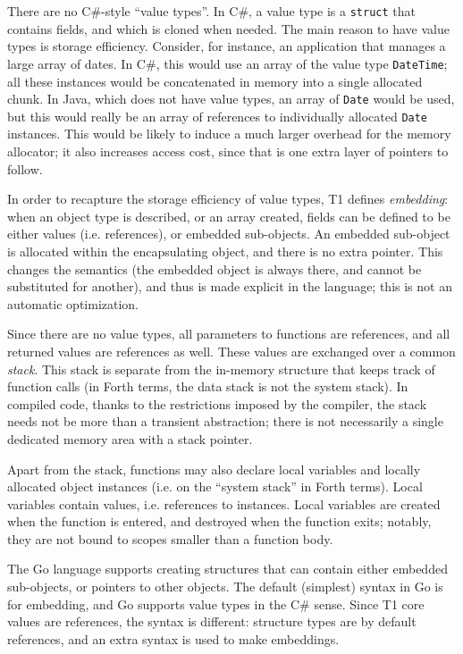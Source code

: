 There are no C\#-style ``value types''. In C\#, a value type is a
\verb+struct+ that contains fields, and which is cloned when needed. The
main reason to have value types is storage efficiency. Consider, for
instance, an application that manages a large array of dates. In C\#,
this would use an array of the value type \verb+DateTime+; all these
instances would be concatenated in memory into a single allocated chunk.
In Java, which does not have value types, an array of \verb+Date+ would
be used, but this would really be an array of references to individually
allocated \verb+Date+ instances. This would be likely to induce a much
larger overhead for the memory allocator; it also increases access cost,
since that is one extra layer of pointers to follow.

In order to recapture the storage efficiency of value types, T1 defines
\emph{embedding}: when an object type is described, or an array created,
fields can be defined to be either values (i.e. references), or embedded
sub-objects. An embedded sub-object is allocated within the
encapsulating object, and there is no extra pointer. This changes the
semantics (the embedded object is always there, and cannot be
substituted for another), and thus is made explicit in the language;
this is not an automatic optimization.

Since there are no value types, all parameters to functions are
references, and all returned values are references as well. These values
are exchanged over a common \emph{stack}. This stack is separate from
the in-memory structure that keeps track of function calls (in Forth
terms, the data stack is not the system stack). In compiled code, thanks
to the restrictions imposed by the compiler, the stack needs not be more
than a transient abstraction; there is not necessarily a single
dedicated memory area with a stack pointer.

Apart from the stack, functions may also declare local variables and
locally allocated object instances (i.e. on the ``system stack'' in
Forth terms). Local variables contain values, i.e. references to
instances. Local variables are created when the function is entered, and
destroyed when the function exits; notably, they are not bound to scopes
smaller than a function body.

The Go language supports creating structures that can contain either
embedded sub-objects, or pointers to other objects. The default
(simplest) syntax in Go is for embedding, and Go supports value types in
the C\# sense. Since T1 core values are references, the syntax is
different: structure types are by default references, and an extra
syntax is used to make embeddings.

